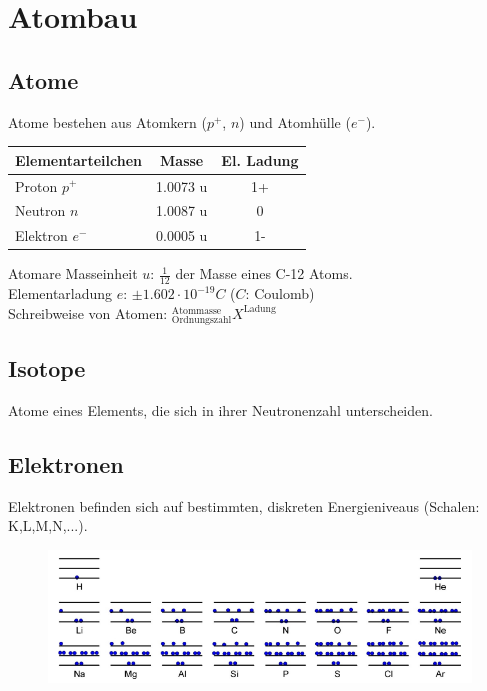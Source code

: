 \section{Atombau}

\subsection{Atome}
Atome bestehen aus Atomkern ($p^+$, $n$) und Atomhülle ($e^-$).

\begin{table}[htbp]
	\begin{tabular}{|l|c|c|}
		Elementarteilchen & Masse & El. Ladung \\ \hline
		Proton $p^+$ & 1.0073 u & 1+ \\
		Neutron $n$ & 1.0087 u & 0 \\
		Elektron $e^-$ & 0.0005 u & 1- \\ \hline
	\end{tabular}
\end{table}

Atomare Masseinheit $u$: $\frac{1}{12}$ der Masse eines C-12 Atoms. \\

Elementarladung $e$: $\pm 1.602 \cdot 10^{-19} C$ ($C$: Coulomb) \\

Schreibweise von Atomen: $ ^\text{Atommasse}_\text{Ordnungszahl} X ^\text{Ladung}$ \\

\subsection{Isotope}
Atome eines Elements, die sich in ihrer Neutronenzahl unterscheiden.

\subsection{Elektronen}
Elektronen befinden sich auf bestimmten, diskreten Energieniveaus (Schalen: K,L,M,N,...). 

\begin{figure}[htbp]
	\centering
	\includegraphics[width=0.9\linewidth]{images/2_Energie_der_Elektronen.png}
\end{figure}

